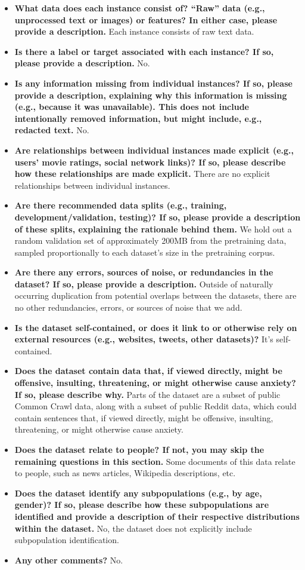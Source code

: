 \documentclass[11pt]{article}
\begin{document}
\begin{itemize}
    \item \textbf{What data does each instance consist of? “Raw” data (e.g., unprocessed text or images) or features? In either case, please provide a description.} Each instance consists of raw text data.
    \item \textbf{Is there a label or target associated with each instance? If so, please provide a description.} No.
    \item \textbf{Is any information missing from individual instances? If so, please provide a description, explaining why this information is missing (e.g., because it was unavailable). This does not include intentionally removed information, but might include, e.g., redacted text.} No.
    \item \textbf{Are relationships between individual instances made explicit (e.g., users' movie ratings, social network links)? If so, please describe how these relationships are made explicit.} There are no explicit relationships between individual instances.
    \item \textbf{Are there recommended data splits (e.g., training, development/validation, testing)? If so, please provide a description of these splits, explaining the rationale behind them.} We hold out a random validation set of approximately 200MB from the pretraining data, sampled proportionally to each dataset's size in the pretraining corpus.
    \item \textbf{Are there any errors, sources of noise, or redundancies in the dataset? If so, please provide a description.}  Outside of naturally occurring duplication from potential overlaps between the datasets, there are no other redundancies, errors, or sources of noise that we add.
    \item \textbf{Is the dataset self-contained, or does it link to or otherwise rely on external resources (e.g., websites, tweets, other datasets)?} It's self-contained.
    \item \textbf{Does the dataset contain data that, if viewed directly, might be offensive, insulting, threatening, or might otherwise cause anxiety? If so, please describe why.} Parts of the dataset are a subset of public Common Crawl data, along with a subset of public Reddit data, which could contain sentences that, if viewed directly, might be offensive, insulting, threatening, or might otherwise cause anxiety.
    \item \textbf{Does the dataset relate to people? If not, you may skip the remaining questions in this section.}  Some documents of this data relate to people, such as news articles, Wikipedia descriptions, etc.
    \item \textbf{Does the dataset identify any subpopulations (e.g., by age, gender)? If so, please describe how these subpopulations are identified and provide a description of their respective distributions within the dataset.} No, the dataset does not explicitly include subpopulation identification.
    \item \textbf{Any other comments?} No.
\end{itemize}
\end{document}

